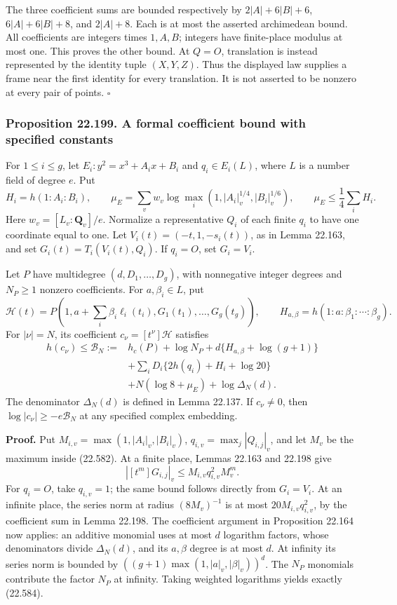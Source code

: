 \documentclass[
  11pt,
  a4paper,
]{article}
\begin{document}
The three coefficient sums are bounded respectively by \(2|A|+6|B|+6\),
\(6|A|+6|B|+8\), and \(2|A|+8\). Each is at most the asserted
archimedean bound. All coefficients are integers times \(1,A,B\);
integers have finite-place modulus at most one. This proves the other
bound. At \(Q=O\), translation is instead represented by the identity
tuple \((X,Y,Z)\). Thus the displayed law supplies a frame near the
first identity for every translation. It is not asserted to be nonzero
at every pair of points. \(\square\)

\subsubsection{Proposition 22.199. A formal coefficient bound with
specified
constants}\label{proposition-22.199.-a-formal-coefficient-bound-with-specified-constants}

For \(1\le i\le g\), let \(E_i:y^2=x^3+A_ix+B_i\) and \(q_i\in E_i(L)\),
where \(L\) is a number field of degree \(e\). Put \[
 H_i=h(1:A_i:B_i),\qquad
 \mu_E=\sum_v w_v\log\max_i(1,|A_i|_v^{1/4},|B_i|_v^{1/6}),
 \qquad \mu_E\le\frac14\sum_iH_i.
 \tag{22.582}
\] Here \(w_v=[L_v:\mathbf Q_v]/e\). Normalize a representative \(Q_i\)
of each finite \(q_i\) to have one coordinate equal to one. Let
\(V_i(t)=(-t,1,-s_i(t))\), as in Lemma 22.163, and set
\(G_i(t)=T_i(V_i(t),Q_i)\). If \(q_i=O\), set \(G_i=V_i\).

Let \(P\) have multidegree \((d,D_1,\ldots,D_g)\), with nonnegative
integer degrees and \(N_P\ge1\) nonzero coefficients. For
\(a,\beta_i\in L\), put \[
 \mathscr H(t)=P\left(1,a+\sum_i\beta_i\ell_i(t_i),
                                  G_1(t_1),\ldots,G_g(t_g)\right),
 \qquad H_{a,\beta}=h(1:a:\beta_1:\cdots:\beta_g).
 \tag{22.583}
\] For \(|\nu|=N\), its coefficient \(c_\nu=[t^\nu]\mathscr H\)
satisfies \[
\begin{split}
 h(c_\nu)\le\mathcal B_N:={}&h_c(P)+\log N_P
       +d\{H_{a,\beta}+\log(g+1)\}\\
 &+\sum_iD_i\{2h(q_i)+H_i+\log20\}\\
 &+N(\log8+\mu_E)+\log\Delta_N(d).
\end{split}
\tag{22.584}
\] The denominator \(\Delta_N(d)\) is defined in Lemma 22.137. If
\(c_\nu\ne0\), then \(\log|c_\nu|\ge-e\mathcal B_N\) at any specified
complex embedding.

\textbf{Proof.} Put \(M_{i,v}=\max(1,|A_i|_v,|B_i|_v)\),
\(q_{i,v}=\max_j|Q_{i,j}|_v\), and let \(M_v\) be the maximum inside
(22.582). At a finite place, Lemmas 22.163 and 22.198 give \[
 |[t^m]G_{i,j}|_v\le M_{i,v}q_{i,v}^2M_v^m.
 \tag{22.585}
\] For \(q_i=O\), take \(q_{i,v}=1\); the same bound follows directly
from \(G_i=V_i\). At an infinite place, the series norm at radius
\((8M_v)^{-1}\) is at most \(20M_{i,v}q_{i,v}^2\), by the coefficient
sum in Lemma 22.198. The coefficient argument in Proposition 22.164 now
applies: an additive monomial uses at most \(d\) logarithm factors,
whose denominators divide \(\Delta_N(d)\), and its \(a,\beta\) degree is
at most \(d\). At infinity its series norm is bounded by
\(((g+1)\max(1,|a|_v,|\beta|_v))^d\). The \(N_P\) monomials contribute
the factor \(N_P\) at infinity. Taking weighted logarithms yields
exactly (22.584).
\end{document}
